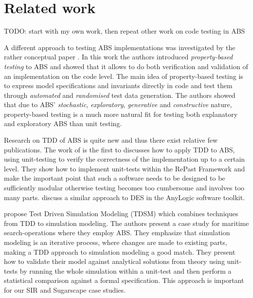 \section{Related work}
TODO: start with my own work, then repeat other work on code testing in ABS

A different approach to testing ABS implementations was investigated by the rather conceptual paper \cite{thaler_show_2019}. In this work the authors introduced \textit{property-based testing} to ABS and showed that it allows to do both verification and validation of an implementation on the code level. The main idea of property-based testing is to express model specifications and invariants directly in code and test them through \textit{automated} and \textit{randomised} test data generation. The authors showed that due to ABS' \textit{stochastic}, \textit{exploratory}, \textit{generative} and \textit{constructive} nature, property-based testing is a much more natural fit for testing both explanatory and exploratory ABS than unit testing. 


Research on TDD of ABS is quite new and thus there exist relative few publications. The work of \cite{collier_test-driven_2013} is the first to discusses how to apply TDD to ABS, using unit-testing to verify the correctness of the implementation up to a certain level. They show how to implement unit-tests within the RePast Framework  and make the important point that such a software needs to be designed to be sufficiently modular otherwise testing becomes too cumbersome and involves too many parts. \cite{asta_investigation_2014} discuss a similar approach to DES in the AnyLogic software toolkit. 

\cite{onggo_test-driven_2016} propose Test Driven Simulation Modeling (TDSM) which combines techniques from TDD to simulation modeling. The authors present a case study for maritime search-operations where they employ ABS. They emphasize that simulation modeling is an iterative process, where changes are made to existing parts, making a TDD approach to simulation modeling a good match. They present how to validate their model against analytical solutions from theory using unit-tests by running the whole simulation within a unit-test and then perform a statistical comparison against a formal specification. This approach is important for our SIR and Sugarscape case studies.

